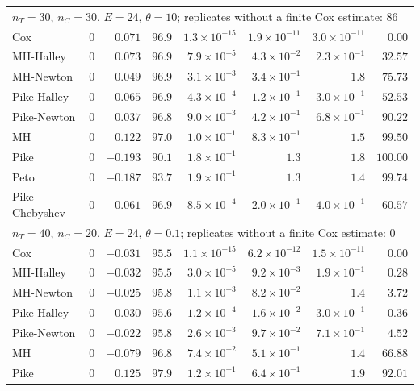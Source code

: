 \begin{landscape}
\begin{longtable}{lrrrrrrr}
\multicolumn{8}{l}{$n_T = 30$, $n_C = 30$, $E = 24$, $\theta = 10$; replicates without a finite Cox estimate: 86} \\
Cox & 0 & $0.071$ & $96.9$ & $1.3 \times 10^{-15}$ & $1.9 \times 10^{-11}$ & $3.0 \times 10^{-11}$ & $0.00$ \\
MH-Halley & 0 & $0.073$ & $96.9$ & $7.9 \times 10^{-5}$ & $4.3 \times 10^{-2}$ & $2.3 \times 10^{-1}$ & $32.57$ \\
MH-Newton & 0 & $0.049$ & $96.9$ & $3.1 \times 10^{-3}$ & $3.4 \times 10^{-1}$ & $1.8$ & $75.73$ \\
Pike-Halley & 0 & $0.065$ & $96.9$ & $4.3 \times 10^{-4}$ & $1.2 \times 10^{-1}$ & $3.0 \times 10^{-1}$ & $52.53$ \\
Pike-Newton & 0 & $0.037$ & $96.8$ & $9.0 \times 10^{-3}$ & $4.2 \times 10^{-1}$ & $6.8 \times 10^{-1}$ & $90.22$ \\
MH & 0 & $0.122$ & $97.0$ & $1.0 \times 10^{-1}$ & $8.3 \times 10^{-1}$ & $1.5$ & $99.50$ \\
Pike & 0 & $-0.193$ & $90.1$ & $1.8 \times 10^{-1}$ & $1.3$ & $1.8$ & $100.00$ \\
Peto & 0 & $-0.187$ & $93.7$ & $1.9 \times 10^{-1}$ & $1.3$ & $1.4$ & $99.74$ \\
Pike-Chebyshev & 0 & $0.061$ & $96.9$ & $8.5 \times 10^{-4}$ & $2.0 \times 10^{-1}$ & $4.0 \times 10^{-1}$ & $60.57$ \\
\multicolumn{8}{l}{$n_T = 40$, $n_C = 20$, $E = 24$, $\theta = 0.1$; replicates without a finite Cox estimate: 0} \\
Cox & 0 & $-0.031$ & $95.5$ & $1.1 \times 10^{-15}$ & $6.2 \times 10^{-12}$ & $1.5 \times 10^{-11}$ & $0.00$ \\
MH-Halley & 0 & $-0.032$ & $95.5$ & $3.0 \times 10^{-5}$ & $9.2 \times 10^{-3}$ & $1.9 \times 10^{-1}$ & $0.28$ \\
MH-Newton & 0 & $-0.025$ & $95.8$ & $1.1 \times 10^{-3}$ & $8.2 \times 10^{-2}$ & $1.4$ & $3.72$ \\
Pike-Halley & 0 & $-0.030$ & $95.6$ & $1.2 \times 10^{-4}$ & $1.6 \times 10^{-2}$ & $3.0 \times 10^{-1}$ & $0.36$ \\
Pike-Newton & 0 & $-0.022$ & $95.8$ & $2.6 \times 10^{-3}$ & $9.7 \times 10^{-2}$ & $7.1 \times 10^{-1}$ & $4.52$ \\
MH & 0 & $-0.079$ & $96.8$ & $7.4 \times 10^{-2}$ & $5.1 \times 10^{-1}$ & $1.4$ & $66.88$ \\
Pike & 0 & $0.125$ & $97.9$ & $1.2 \times 10^{-1}$ & $6.4 \times 10^{-1}$ & $1.9$ & $92.01$ \\

\end{longtable}
\end{landscape}
